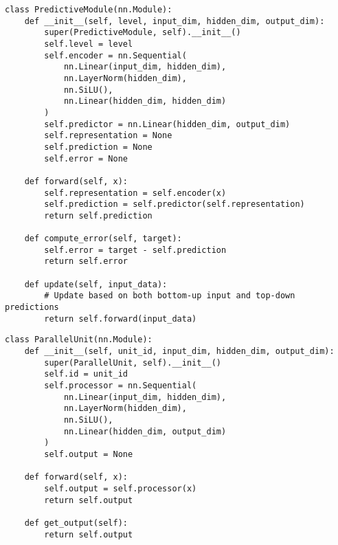 \documentclass[11pt,a4paper,twocolumn]{article}
\begin{document}
\begin{lstlisting}[caption={Hierarchical Prediction Module Implementation}, label={lst:predictive-module}]
class PredictiveModule(nn.Module):
    def __init__(self, level, input_dim, hidden_dim, output_dim):
        super(PredictiveModule, self).__init__()
        self.level = level
        self.encoder = nn.Sequential(
            nn.Linear(input_dim, hidden_dim),
            nn.LayerNorm(hidden_dim),
            nn.SiLU(),
            nn.Linear(hidden_dim, hidden_dim)
        )
        self.predictor = nn.Linear(hidden_dim, output_dim)
        self.representation = None
        self.prediction = None
        self.error = None

    def forward(self, x):
        self.representation = self.encoder(x)
        self.prediction = self.predictor(self.representation)
        return self.prediction

    def compute_error(self, target):
        self.error = target - self.prediction
        return self.error

    def update(self, input_data):
        # Update based on both bottom-up input and top-down predictions
        return self.forward(input_data)
\end{lstlisting}

\begin{lstlisting}[caption={Parallel Processing Unit Implementation}, label={lst:parallel-unit}]
class ParallelUnit(nn.Module):
    def __init__(self, unit_id, input_dim, hidden_dim, output_dim):
        super(ParallelUnit, self).__init__()
        self.id = unit_id
        self.processor = nn.Sequential(
            nn.Linear(input_dim, hidden_dim),
            nn.LayerNorm(hidden_dim),
            nn.SiLU(),
            nn.Linear(hidden_dim, output_dim)
        )
        self.output = None

    def forward(self, x):
        self.output = self.processor(x)
        return self.output

    def get_output(self):
        return self.output
\end{lstlisting}
\end{document}
